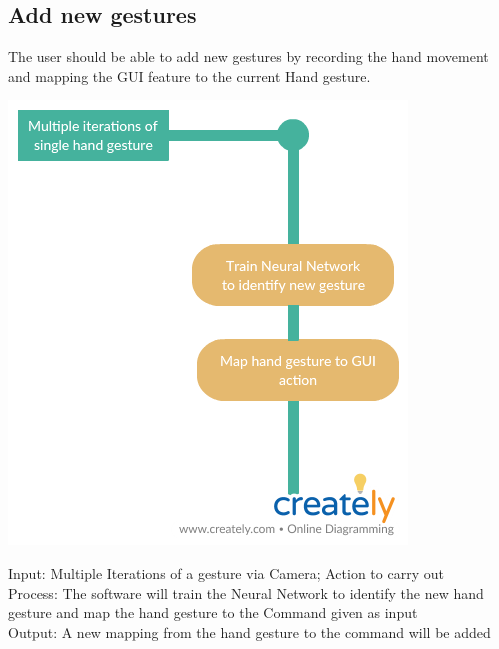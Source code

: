 \documentclass[11pt]{report}
\begin{document}
\subsection{Add new gestures}
The user should be able to add new gestures by recording the hand movement and mapping the GUI feature to the current Hand gesture.
\begin{center}
    \includegraphics[scale=0.5]{add.png}
\end{center}
Input: Multiple Iterations of a gesture via Camera; Action to carry out
\\Process: The software will train the Neural Network to identify the new hand gesture and map the hand gesture to the Command given as input
\\Output: A new mapping from the hand gesture to the command will be added
\end{document}
